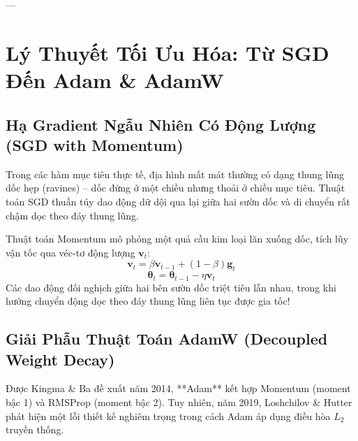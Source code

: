 ---

\section{Lý Thuyết Tối Ưu Hóa: Từ SGD Đến Adam \& AdamW}
\label{sec:optimization-adamw}

\subsection{Hạ Gradient Ngẫu Nhiên Có Động Lượng (SGD with Momentum)}
Trong các hàm mục tiêu thực tế, địa hình mất mát thường có dạng thung lũng dốc hẹp (ravines) -- dốc đứng ở một chiều nhưng thoải ở chiều mục tiêu. Thuật toán SGD thuần túy dao động dữ dội qua lại giữa hai sườn dốc và di chuyển rất chậm dọc theo đáy thung lũng.

Thuật toán Momentum mô phỏng một quả cầu kim loại lăn xuống dốc, tích lũy vận tốc qua véc-tơ động lượng $\mathbf{v}_t$:
\begin{equation}
\mathbf{v}_t = \beta \mathbf{v}_{t-1} + (1 - \beta) \mathbf{g}_t
\end{equation}
\begin{equation}
\boldsymbol{\theta}_t = \boldsymbol{\theta}_{t-1} - \eta \mathbf{v}_t
\end{equation}
Các dao động đối nghịch giữa hai bên sườn dốc triệt tiêu lẫn nhau, trong khi hướng chuyển động dọc theo đáy thung lũng liên tục được gia tốc!

\subsection{Giải Phẫu Thuật Toán AdamW (Decoupled Weight Decay)}
Được Kingma \& Ba đề xuất năm 2014, **Adam** kết hợp Momentum (moment bậc 1) và RMSProp (moment bậc 2). Tuy nhiên, năm 2019, Loshchilov \& Hutter phát hiện một lỗi thiết kế nghiêm trọng trong cách Adam áp dụng điều hòa $L_2$ truyền thống.

